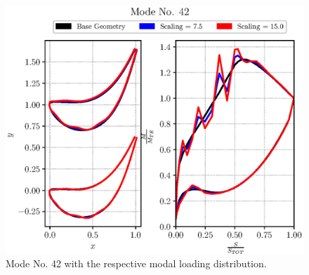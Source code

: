 \begin{figure}[H]
    \centering
    \includegraphics[scale=\scaleBlade]{./images/mode42.eps}
    \caption{Mode No. 42 with the respective modal loading distribution.}
    \label{fig:PCAmode42}
\end{figure}
